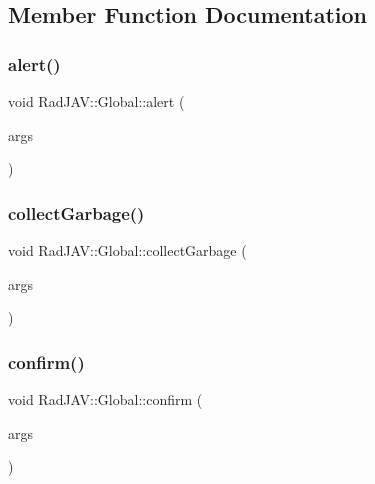 \subsection{Member Function Documentation}
\mbox{\label{class_rad_j_a_v_1_1_global_a62817cffccdbde43a591042002c56f72}} 
\subsubsection{\texorpdfstring{alert()}{alert()}}
{\footnotesize\ttfamily void Rad\+J\+A\+V\+::\+Global\+::alert (\begin{DoxyParamCaption}\item[{const v8\+::\+Function\+Callback\+Info$<$ v8\+::\+Value $>$ \&}]{args }\end{DoxyParamCaption})\hspace{0.3cm}{\ttfamily [static]}}

\mbox{\label{class_rad_j_a_v_1_1_global_ac5b750ecedb422b20b9d89b46d06bebc}} 
\subsubsection{\texorpdfstring{collect\+Garbage()}{collectGarbage()}}
{\footnotesize\ttfamily void Rad\+J\+A\+V\+::\+Global\+::collect\+Garbage (\begin{DoxyParamCaption}\item[{const v8\+::\+Function\+Callback\+Info$<$ v8\+::\+Value $>$ \&}]{args }\end{DoxyParamCaption})\hspace{0.3cm}{\ttfamily [static]}}

\mbox{\label{class_rad_j_a_v_1_1_global_ac7eb391b4cd7336c74f6c1b7967df044}} 
\subsubsection{\texorpdfstring{confirm()}{confirm()}}
{\footnotesize\ttfamily void Rad\+J\+A\+V\+::\+Global\+::confirm (\begin{DoxyParamCaption}\item[{const v8\+::\+Function\+Callback\+Info$<$ v8\+::\+Value $>$ \&}]{args }\end{DoxyParamCaption})\hspace{0.3cm}{\ttfamily [static]}}

